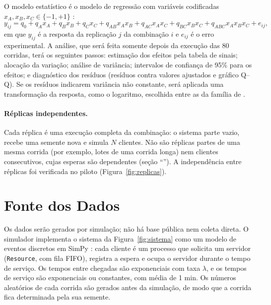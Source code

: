 \documentclass[stu,a4paper,12pt,floatsintext,biblatex]{apa7}
\begin{document}
O modelo estatístico é o modelo de regressão com variáveis codificadas $x_A, x_B, x_C \in \{-1, +1\}$ \parencite{jain1991}:
\begin{equation}
y_{ij} = q_0 + q_A x_A + q_B x_B + q_C x_C + q_{AB} x_A x_B + q_{AC} x_A x_C + q_{BC} x_B x_C + q_{ABC} x_A x_B x_C + e_{ij},
\end{equation}
em que $y_{ij}$ é a resposta da replicação $j$ da combinação $i$ e $e_{ij}$ é o erro experimental.
A análise, que será feita somente depois da execução das 80 corridas, terá os seguintes passos: estimação dos efeitos pela tabela de sinais; alocação da variação; análise de variância; intervalos de confiança de 95\% para os efeitos; e diagnóstico dos resíduos (resíduos contra valores ajustados e gráfico Q--Q).
Se os resíduos indicarem variância não constante, será aplicada uma transformação da resposta, como o logaritmo, escolhida entre as da família de \textcite{box1964} \parencite[ver também][]{montgomery2017}.

\paragraph{Réplicas independentes.}
Cada réplica é uma execução completa da combinação: o sistema parte vazio, recebe uma semente nova e simula $N$ clientes.
Não são réplicas partes de uma mesma corrida (por exemplo, lotes de uma corrida longa) nem clientes consecutivos, cujas esperas são dependentes (seção \enquote{}).
A independência entre réplicas foi verificada no piloto (Figura~\ref{fig:replicas}).

\section{Fonte dos Dados}
Os dados serão gerados por simulação; não há base pública nem coleta direta.
O simulador implementa o sistema da Figura~\ref{fig:sistema} como um modelo de eventos discretos em SimPy \parencite{simpy}: cada cliente é um processo que solicita um servidor (\texttt{Resource}, com fila FIFO), registra a espera e ocupa o servidor durante o tempo de serviço.
Os tempos entre chegadas são exponenciais com taxa $\lambda$, e os tempos de serviço são exponenciais ou constantes, com média de 1 min.
Os números aleatórios de cada corrida são gerados antes da simulação, de modo que a corrida fica determinada pela sua semente.
\end{document}
